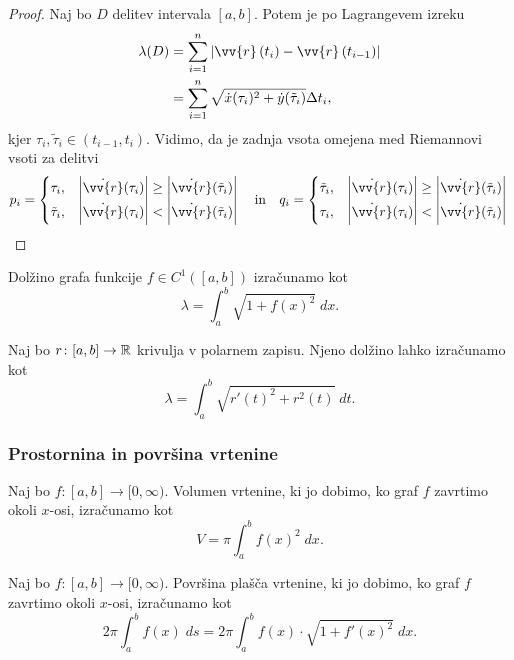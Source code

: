\documentclass[12pt, a4paper]{article}
\begin{document}
\begin{proof}
Naj bo $D$ delitev intervala $[a,b]$. Potem je po Lagrangevem izreku
\begin{align*}
\lambda(D)&=\sum_{i=1}^n\abs{\vv{r}\left(t_i\right)-\vv{r}\left(t_{i-1}\right)}
\\
&=\sum_{i=1}^n\sqrt{\dot{x}(\tau_i)^2+\dot{y}(\tilde{\tau}_i)}\Delta t_i,
\end{align*}
kjer $\tau_i,\tilde{\tau}_i\in(t_{i-1},t_i)$. Vidimo, da je zadnja vsota omejena med Riemannovi vsoti za delitvi %
\[
p_i=\begin{cases}
\tau_i, & \abs{\dot{\vv{r}}(\tau_i)}\geq \abs{\dot{\vv{r}}(\tilde{\tau}_i)}
\\
\tilde{\tau}_i, & \abs{\dot{\vv{r}}(\tau_i)}<\abs{\dot{\vv{r}}(\tilde{\tau}_i)}
\end{cases}
\quad\text{in}\quad
q_i=\begin{cases}
\tilde{\tau}_i, & \abs{\dot{\vv{r}}(\tau_i)}\geq \abs{\dot{\vv{r}}(\tilde{\tau}_i)}
\\
\tau_i, & \abs{\dot{\vv{r}}(\tau_i)}<\abs{\dot{\vv{r}}(\tilde{\tau}_i)}
\end{cases}\qedhere
\]
\end{proof}

\begin{posledica}
Dolžino grafa funkcije $f\in C^1([a,b])$ izračunamo kot
\[
\lambda=\int_a^b \sqrt{1+f(x)^2}\;dx.
\]
\end{posledica}

\begin{posledica}
Naj bo $r\colon[a,b]\to\mathbb{R}$ krivulja v polarnem zapisu. Njeno dolžino lahko izračunamo kot
\[
\lambda=\int_a^b\sqrt{r'(t)^2+r^2(t)}\;dt.
\]
\end{posledica}

\obvs


\subsubsection{Prostornina in površina vrtenine}

\begin{trditev}
Naj bo $f\colon[a,b]\to[0,\infty)$. Volumen vrtenine, ki jo dobimo, ko graf $f$ zavrtimo okoli $x$-osi, izračunamo kot
\[
V=\pi\int_a^b f(x)^2\;dx.
\]
\end{trditev}

\begin{trditev}
Naj bo $f\colon[a,b]\to[0,\infty)$. Površina plašča vrtenine, ki jo dobimo, ko graf $f$ zavrtimo okoli $x$-osi, izračunamo kot
\[
2\pi\int_a^b f(x)\;ds=2\pi\int_a^b f(x)\cdot\sqrt{1+f'(x)^2}\;dx.
\]
\end{trditev}
\end{document}
